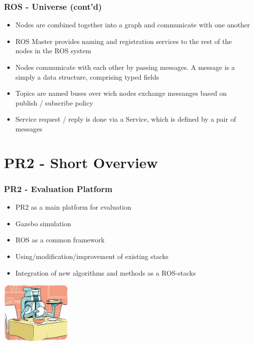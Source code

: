 \begin{frame}
  \frametitle{ROS - Universe (cont'd)}

\begin{itemize}
 \item Nodes are combined together into a graph and communicate with one another
 \item ROS Master provides naming and registration services to the rest of the nodes in the ROS system
 \item Nodes communicate with each other by passing messages. A message is a simply a data structure, comprising typed fields
 \item Topics are named buses over wich nodes exchange messanges based on publish / subscribe policy
 \item Service request / reply is done via a Service, which is defined by a pair of messages 
\end{itemize} 
\end{frame}

\section{PR2 - Short Overview}

\begin{frame}
  \frametitle{PR2 - Evaluation Platform}

\begin{itemize}
 \item PR2 as a main platform for evaluation
 \item Gazebo simulation
 \item ROS as a common framework
 \item Using/modification/improvement of existing stacks
 \item Integration of new algorithms and methods as a ROS-stacks   
\end{itemize}

\vspace{1ex}\hspace{42ex}\includegraphics[width=3.5cm]{../images/pr2_dinnertable.jpg} 
\end{frame}

